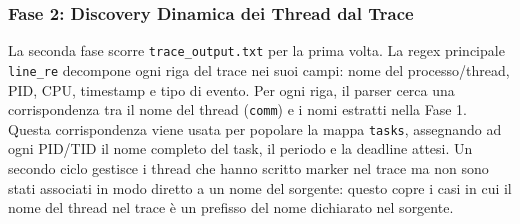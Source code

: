 	\subsubsection{Fase 2: Discovery Dinamica dei Thread dal Trace}
	
	La seconda fase scorre \texttt{trace\_output.txt} per la prima volta.
	La regex principale \texttt{line\_re} decompone ogni riga del trace nei suoi
	campi: nome del processo/thread, PID, CPU, timestamp e tipo di evento.
	Per ogni riga, il parser cerca una corrispondenza tra il nome del thread
	(\texttt{comm}) e i nomi estratti nella Fase 1. Questa corrispondenza viene
	usata per popolare la mappa \texttt{tasks}, assegnando ad ogni PID/TID il nome
	completo del task, il periodo e la deadline attesi. Un secondo ciclo gestisce i thread che hanno scritto marker nel trace ma non sono
	stati associati in modo diretto a un nome del sorgente: questo copre i casi in
	cui il nome del thread nel trace è un prefisso del nome dichiarato nel sorgente.


